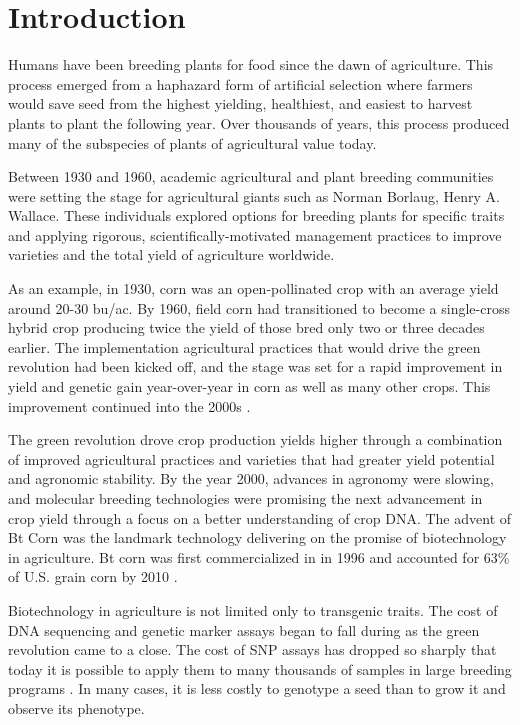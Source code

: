 \section{Introduction} \label{sec:gen-intro}

Humans have been breeding plants for food since the dawn of agriculture. This process
emerged from a haphazard form of artificial selection where farmers would save seed from the 
highest yielding, healthiest, and easiest to harvest plants to plant the following year. 
Over thousands of years, this process produced many of the subspecies of plants of  
agricultural value today.

Between 1930 and 1960, academic agricultural and plant breeding communities were setting the
stage for agricultural giants such as Norman Borlaug, Henry A. Wallace. These individuals 
explored options for breeding plants for specific traits and applying rigorous, 
scientifically-motivated management practices to improve varieties and the total yield 
of agriculture worldwide.

As an example, in 1930, corn was an open-pollinated crop with an average 
yield around 20-30 bu/ac. By 1960, field corn had transitioned to become a single-cross 
hybrid crop producing twice the yield of those bred only two or three decades earlier. The implementation
agricultural practices that would drive the green revolution had been kicked off, and
the stage was set for a rapid improvement in yield and genetic gain year-over-year in
corn as well as many other crops. This improvement continued into the 2000s \citep{evenson2003}.

The green revolution drove crop production yields higher through a combination of 
improved agricultural practices and varieties that had greater yield potential
and agronomic stability. By the year 2000, advances in agronomy were slowing, and 
molecular breeding technologies were promising the next advancement in crop yield
through a focus on a better understanding of crop DNA. The advent of Bt Corn was the
landmark technology delivering on the promise of biotechnology in agriculture.
Bt corn was first commercialized in in 1996 and accounted for 63\% of U.S. grain 
corn by 2010 \citep{fernandez2012}. 

Biotechnology in agriculture is not limited only to transgenic traits. The cost of 
DNA sequencing and genetic marker assays began to fall during as the green revolution
came to a close. The cost of SNP assays has dropped so sharply that today it is 
possible to apply them to many thousands of samples in large breeding programs \citep{hiremath2012}. 
In many cases, it is less costly to genotype a seed than to grow it and observe its phenotype.

